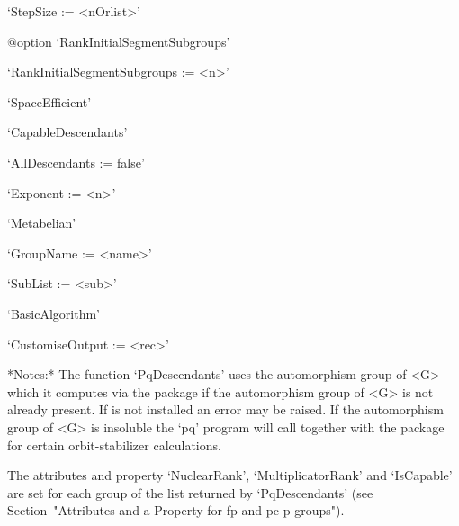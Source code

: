 \item{}`StepSize := <nOrlist>'

%
{@option \noexpand`RankInitialSegmentSubgroups'}
\item{}`RankInitialSegmentSubgroups := <n>'

\item{}`SpaceEfficient'

\item{}`CapableDescendants'

\item{}`AllDescendants := false'

\item{}`Exponent := <n>'

\item{}`Metabelian'

\item{}`GroupName := <name>'

\item{}`SubList := <sub>'

\item{}`BasicAlgorithm'

\item{}`CustomiseOutput := <rec>'

\endlist

*Notes:* The function `PqDescendants'  uses the automorphism group of <G>
which it computes via the package {\AutPGrp} if the automorphism group of
<G> is not already present.  If  {\AutPGrp} is not installed an error may
be  raised.  If  the  automorphism group  of  <G> is  insoluble the  `pq'
program will call {\GAP} together with the {\AutPGrp} package for certain
orbit-stabilizer calculations.

The  attributes  and  property  `NuclearRank',  `MultiplicatorRank'   and
`IsCapable'  are  set  for  each  group   of   the   list   returned   by
`PqDescendants' (see Section~"Attributes and a Property  for  fp  and  pc
p-groups").

